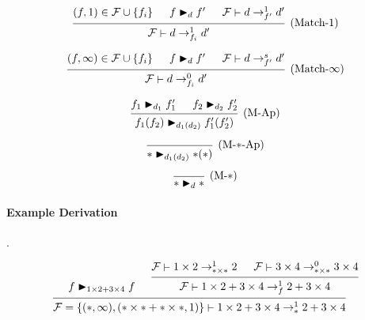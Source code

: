 \documentclass{article}
\newcommand{\entails}{\mathrel{\mathop\vdash}}
\newcommand{\matches}{\mathrel{\mathop{\blacktriangleright}}}
\begin{document}
\[
  \begin{prooftree}
    \hypo{(f, 1) \in \mathcal{F} \cup \{ f_i \}}
    \hypo{f \matches_d f'}
    \hypo{\mathcal{F} \entails d \to_{f'}^{1} d'}
    \infer3[(Match-1)]{\mathcal{F} \entails d \to_{f_i}^{1} d'}
  \end{prooftree}
\]

\[
  \begin{prooftree}
    \hypo{(f, \infty) \in \mathcal{F} \cup \{ f_i \}}
    \hypo{f \matches_d f'}
    \hypo{\mathcal{F} \entails d \to_{f'}^{s} d'}
    \infer3[(Match-\(\infty\))]{\mathcal{F} \entails d
    \to_{f_i}^{0} d'}
  \end{prooftree}
\]

\[
  \begin{prooftree}
    \hypo{f_1 \matches_{d_1} f_1'}
    \hypo{f_2 \matches_{d_2} f_2'}
    \infer2[(M-Ap)]{f_1(f_2) \matches_{d_1(d_2)} f_1'(f_2')}
  \end{prooftree}
\]

\[
  \begin{prooftree}
    \infer0[(M-\(\ast\)-Ap)]{\ast \matches_{d_1(d_2)} \ast(\ast)}
  \end{prooftree}
\]

\[
  \begin{prooftree}
    \infer0[(M-\(\ast\))]{\ast \matches_{d} \ast}
  \end{prooftree}
\]

\paragraph{Example Derivation}.

\[
  \begin{prooftree}
    \hypo{
      f
      \matches_{1 \times 2 + 3 \times 4}
      f
    }
    \hypo{
      \mathcal{F}
      \entails
      1 \times 2 \to_{\ast \times \ast}^{1} 2
    }
    \hypo{
      \mathcal{F}
      \entails
      3 \times 4 \to_{\ast \times \ast}^{0} 3 \times 4
    }
    \infer2{
      \mathcal{F}
      \entails
      1 \times 2 + 3 \times 4
      \to_{f}^{1}
      2 + 3 \times 4
    }
    \infer2{
      \mathcal{F} =
      \{ (\ast, \infty), (\ast \times \ast + \ast \times \ast, 1) \}
      \entails
      1 \times 2 + 3 \times 4
      \to_{\ast}^{1} 2 + 3 \times 4
    }
  \end{prooftree}
\]
\end{document}
